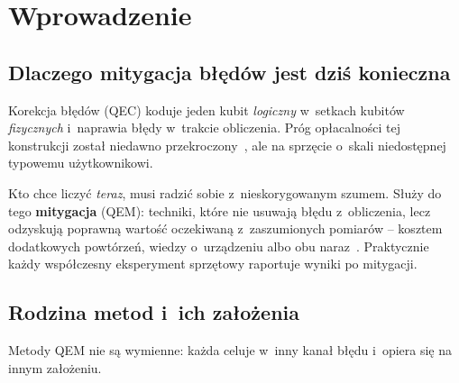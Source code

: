 \documentclass[11pt]{article}
\begin{document}
\begin{abstract}
Zidentyfikowano mechanizm tego załamania -- błąd \emph{koherentny} naruszający założenie liniowości
-- oraz interwencję, która go neutralizuje. \emph{Circuit twirling} przywraca skuteczność CDR na
żywym sprzęcie, przy czym zysk okazuje się przewidywalny: koreluje z~jakością dopasowania bez
twirlingu ($\rho=-0{,}85$, $p=0{,}004$), a~nie bezpośrednio z~liczbą bramek. Jest tym większy, im
bardziej koherencja wcześniej zepsuła liniowość. Daje to regułę decyzyjną możliwą do zastosowania
\emph{przed} wydaniem czasu maszynowego. Współczynnik $r^2$ powstaje jako produkt uboczny samej
procedury CDR, więc kosztuje zero dodatkowych obwodów, a~mimo to mówi, czy w~danym przebiegu warto
uruchamiać twirling -- w~odróżnieniu od liczby bramek, która informuje jedynie o~tym, ile koherencji
\emph{mogło} narosnąć.
\end{abstract}

\section{Wprowadzenie}\label{sec:wstep}

\subsection{Dlaczego mitygacja błędów jest dziś konieczna}

Korekcja błędów (QEC) koduje jeden kubit \emph{logiczny} w~setkach kubitów \emph{fizycznych}
i~naprawia błędy w~trakcie obliczenia. Próg opłacalności tej konstrukcji został niedawno
przekroczony~\cite{googleqec2025}, ale na sprzęcie o~skali niedostępnej typowemu użytkownikowi.

Kto chce liczyć \emph{teraz}, musi radzić sobie z~nieskorygowanym szumem. Służy do tego
\textbf{mitygacja} (QEM): techniki, które nie usuwają błędu z~obliczenia, lecz odzyskują poprawną
wartość oczekiwaną z~zaszumionych pomiarów -- kosztem dodatkowych powtórzeń, wiedzy o~urządzeniu
albo obu naraz~\cite{cai2023}. Praktycznie każdy współczesny eksperyment sprzętowy raportuje wyniki
po mitygacji.

\subsection{Rodzina metod i~ich założenia}\label{sec:rodzina}

Metody QEM nie są wymienne: każda celuje w~inny kanał błędu i~opiera się na innym założeniu.
\end{document}
